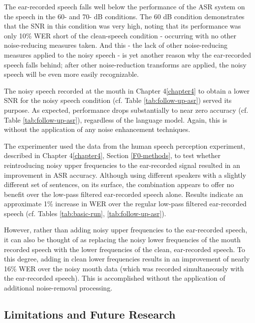 \documentclass[dissertation,copyright]{uathesis}
\begin{document}
The ear-recorded speech falls well below the performance of the ASR system on the speech in the 60- and 70- dB conditions.  The 60 dB condition demonstrates that the SNR in this condition was very high, noting that its performance was only 10\% WER short of the clean-speech condition - occurring with no other noise-reducing measures taken.  And this - the lack of other noise-reducing measures applied to the noisy speech - is yet another reason why the ear-recorded speech falls behind; after other noise-reduction transforms are applied, the noisy speech will be even more easily recognizable.

The noisy speech recorded at the mouth in Chapter 4\ref{chapter4} to obtain a lower SNR for the noisy speech condition (cf. Table \ref{tab:follow-up-asr}) served its purpose.  As expected, performance drops substantially to near zero accuracy (cf. Table \ref{tab:follow-up-asr}), regardless of the language model.  Again, this is without the application of any noise enhancement techniques.

The experimenter used the data from the human speech perception experiment, described in Chapter 4\ref{chapter4}, Section \ref{F0-methods}, to test whether reintroducing noisy upper frequencies to the ear-recorded signal resulted in an improvement in ASR accuracy.  Although using different speakers with a slightly different set of sentences, on its surface, the combination appears to offer no benefit over the low-pass filtered ear-recorded speech alone.  Results indicate an approximate 1\% increase in WER over the regular low-pass filtered ear-recorded speech (cf. Tables \ref{tab:basic-run}, \ref{tab:follow-up-asr}).

However, rather than adding noisy upper frequencies to the ear-recorded speech, it can also be thought of as replacing the noisy lower frequencies of the mouth recorded speech with the lower frequencies of the clean, ear-recorded speech.  To this degree, adding in clean lower frequencies results in an improvement of nearly 16\% WER over the noisy mouth data (which was recorded simultaneously with the ear-recorded speech).  This is accomplished without the application of additional noise-removal processing.

\subsection{Limitations and Future Research}
\end{document}
